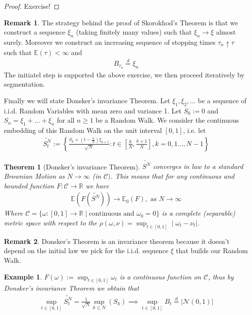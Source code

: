 \documentclass[11pt,a4paper, final]{article}
\newtheorem{thm}{Theorem}[section]
\newtheorem{exmp}{Example}[section]
\theoremstyle{definition}
\newtheorem{rem}{Remark}[section]
\begin{document}
\begin{proof}
Exercise!
\end{proof}
\begin{rem} The strategy behind the proof of Skorokhod's Theorem is that we construct a sequence $\xi_n$ (taking finitely many values) such that $\xi_n \to \xi$ almost surely. Moreover we construct an increasing sequence of stopping times $\tau_n \uparrow \tau$ such that $\mathbb{E}( \tau ) < \infty$ and 
\begin{align*}
B_{\tau_n} \overset{d}= \xi_n
\end{align*}
The initiatel step is supported the above exercise, we then proceed iteratively by segmentation. 
\end{rem}
\noindent Finally we will state Donsker's invariance Theorem. Let $\xi_1, \xi_2, \dots$ be a sequence of i.i.d. Random Variables with mean zero and variance 1. Let $S_0:=0$ and $S_n = \xi_1 + \dots + \xi_n$ for all $n \geq 1$ be a Random Walk. We consider the continuous embedding of this Random Walk on the unit interval $[0,1]$, i.e. let 
\begin{align*}
\widetilde{S_t^N}:= \left\lbrace \frac{S_k+ \left( t- \frac{k}{N}\right) \xi_{k+1}}{\sqrt{N}} : t \in \left[ \frac{k}{N}, \frac{k+1}{N} \right], k = 0,1 \dots , N-1 \right\rbrace 
\end{align*}
\begin{thm}[Donsker's invariance Theorem] $\widetilde{S^N}$ converges in law to a standard Brownian Motion as $N \to \infty$ (in $\mathcal{C})$. This means that for any continuous and bounded function $F: \mathcal{C} \to \mathbb{R}$ we have 
\begin{align*}
\mathbb{E} \left( F \left( \widetilde{S^N} \right) \right) \to \mathbb{E}_0(F), \text{ as } N \to \infty 
\end{align*}
Where $\mathcal{C}=  \lbrace \omega : [0,1] \to \mathbb{R} \mid \text{continuous and } \omega_0 =0 \rbrace$ is a complete (separable) metric space with respect to the $\rho( \omega, \nu) = \sup_{t \in [0,1]} \mid \omega_t - \nu_t |$. 
\end{thm}
\begin{rem} Donsker's Theorem is an invariance theorem because it doesn't depend on the initial law we pick for the i.i.d. sequence $\xi$ that builds our Random Walk. 
\end{rem}
\begin{exmp} $F( \omega):= \sup_{t \in [0,1]} \omega_t$ is a continuous function on $\mathcal{C}$, thus by Donsker's invariance Theorem we obtain that 
\begin{align*}
 \sup_{t \in [0,1]} \widetilde{S_t^N} = \frac{1}{\sqrt{N}} \sup_{k \leq N} (S_k) \implies  \sup_{t \in [0,1]} B_t \overset{d}= | \mathcal{N}(0,1) | 
\end{align*}
\end{exmp}
\end{document}
